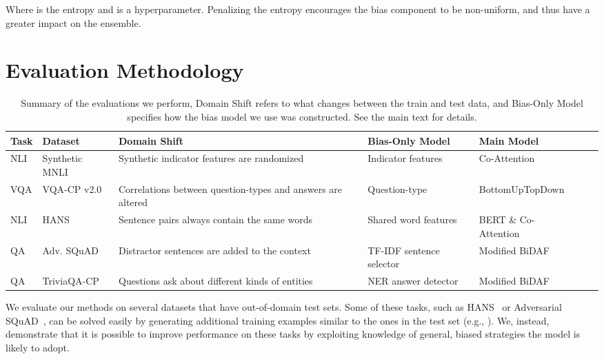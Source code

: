 \documentclass[11pt,a4paper]{article}
\begin{document}
Where  is the entropy and  is a hyperparameter. Penalizing the entropy encourages the bias component to be non-uniform, and thus have a greater impact on the ensemble. 
 
\section{Evaluation Methodology}
\begin{table*}[ht]
    \newcommand{\summarysp}{\addlinespace[0.12cm]}
    \centering
     \begin{small}
    \begin{tabular}{llp{4cm}llll}  \toprule
         Task & Dataset & Domain Shift & Bias-Only Model & Main Model \\ \midrule
         NLI & Synthetic MNLI & Synthetic indicator features are randomized & Indicator features & Co-Attention \\ \summarysp
VQA & VQA-CP v2.0 & Correlations between question-types and answers are altered & Question-type & BottomUpTopDown \\ \summarysp
         NLI & HANS & Sentence pairs always contain the same words & Shared word features & BERT \& Co-Attention \\ \summarysp
         QA & Adv. SQuAD & Distractor sentences are added to the context & TF-IDF sentence selector & Modified BiDAF \\ \summarysp
         QA & TriviaQA-CP & Questions ask about different kinds of entities & NER answer detector & Modified BiDAF \\ 
\bottomrule
    \end{tabular}
    \end{small}
    \caption{Summary of the evaluations we perform, Domain Shift refers to what changes between the train and test data, and Bias-Only Model specifies how the bias model we use was constructed. See the main text for details.}
    \label{tab:evaluations}
\end{table*}

We evaluate our methods on several datasets that have out-of-domain test sets.
Some of these tasks, such as HANS~\cite{mccoy2019right} or Adversarial SQuAD~\cite{adversarial_squad}, can be solved easily by generating additional training examples similar to the ones in the test set (e.g., \citet{wang2018robust}).
We, instead, demonstrate that it is possible to improve performance on these tasks by exploiting knowledge of general, biased strategies the model is likely to adopt.
\end{document}
